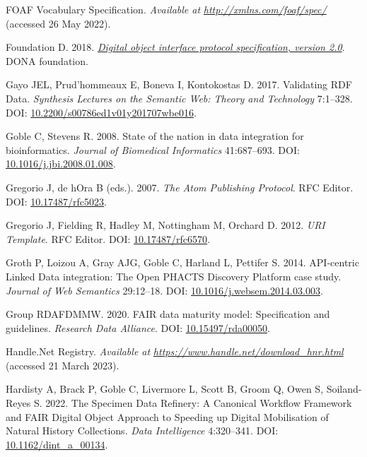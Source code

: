 \begin{CSLReferences}{1}{0}
\leavevmode{}%
FOAF Vocabulary Specification. \emph{Available at} \href{http://xmlns.com/foaf/spec/}{\emph{http://xmlns.com/foaf/spec/}} (accessed 26 May 2022).

\leavevmode{}%
Foundation D. 2018. \emph{\href{https://hdl.handle.net/0.DOIP/DOIPV2.0}{Digital object interface protocol specification, version 2.0}}. DONA foundation.

\leavevmode{}%
Gayo JEL, Prud'hommeaux E, Boneva I, Kontokostas D. 2017. Validating RDF Data. \emph{Synthesis Lectures on the Semantic Web: Theory and Technology} 7:1--328. DOI: \href{https://doi.org/10.2200/s00786ed1v01y201707wbe016}{10.2200/s00786ed1v01y201707wbe016}.

\leavevmode{}%
Goble C, Stevens R. 2008. State of the nation in data integration for bioinformatics. \emph{Journal of Biomedical Informatics} 41:687--693. DOI: \href{https://doi.org/10.1016/j.jbi.2008.01.008}{10.1016/j.jbi.2008.01.008}.

\leavevmode{}%
Gregorio J, de hOra B (eds.). 2007. \emph{The Atom Publishing Protocol}. RFC Editor. DOI: \href{https://doi.org/10.17487/rfc5023}{10.17487/rfc5023}.

\leavevmode{}%
Gregorio J, Fielding R, Hadley M, Nottingham M, Orchard D. 2012. \emph{URI Template}. RFC Editor. DOI: \href{https://doi.org/10.17487/rfc6570}{10.17487/rfc6570}.

\leavevmode{}%
Groth P, Loizou A, Gray AJG, Goble C, Harland L, Pettifer S. 2014. API-centric Linked Data integration: The Open PHACTS Discovery Platform case study. \emph{Journal of Web Semantics} 29:12--18. DOI: \href{https://doi.org/10.1016/j.websem.2014.03.003}{10.1016/j.websem.2014.03.003}.

\leavevmode{}%
Group RDAFDMMW. 2020. FAIR data maturity model: Specification and guidelines. \emph{Research Data Alliance}. DOI: \href{https://doi.org/10.15497/rda00050}{10.15497/rda00050}.

\leavevmode{}%
Handle.Net Registry. \emph{Available at} \href{https://www.handle.net/download_hnr.html}{\emph{https://www.handle.net/download\_hnr.html}} (accessed 21 March 2023).

\leavevmode{}%
Hardisty A, Brack P, Goble C, Livermore L, Scott B, Groom Q, Owen S, Soiland-Reyes S. 2022. The Specimen Data Refinery: A Canonical Workflow Framework and FAIR Digital Object Approach to Speeding up Digital Mobilisation of Natural History Collections. \emph{Data Intelligence} 4:320--341. DOI: \href{https://doi.org/10.1162/dint_a_00134}{10.1162/dint\_a\_00134}.


\end{CSLReferences}
